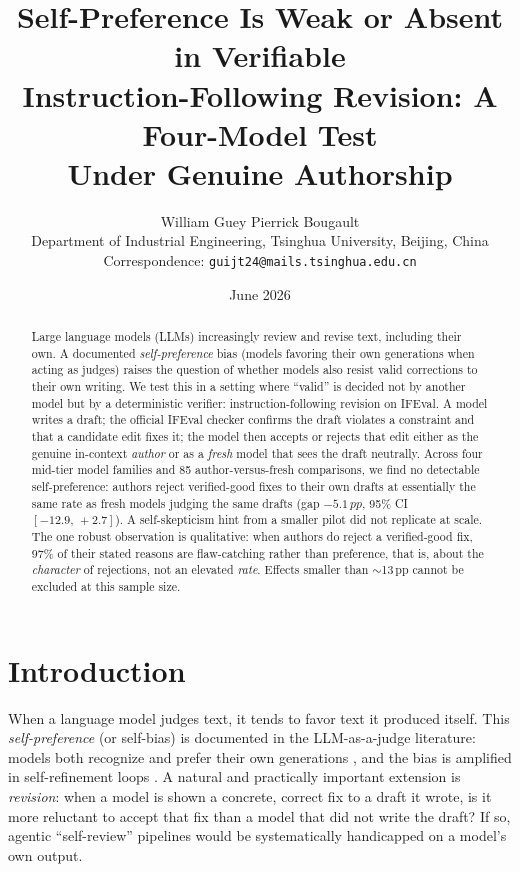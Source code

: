 \documentclass[11pt]{article}
\title{\textbf{Self-Preference Is Weak or Absent in Verifiable\\
Instruction-Following Revision: A Four-Model Test\\
Under Genuine Authorship}}
\author{
William Guey \quad Pierrick Bougault \\[3pt]
\normalsize Department of Industrial Engineering, Tsinghua University, Beijing, China \\[1pt]
\normalsize Correspondence: \texttt{guijt24@mails.tsinghua.edu.cn}
}
\date{June 2026}
\newcommand{\pp}{\,pp}
\newcommand{\CI}[2]{$[#1,\,#2]$}
\begin{document}
\sloppy
\maketitle

\begin{abstract}
\noindent
Large language models (LLMs) increasingly review and revise text, including their own.
A documented \emph{self-preference} bias (models favoring their own generations when
acting as judges) raises the question of whether models also resist valid corrections
to their own writing. We test this in a setting where ``valid'' is decided not by another
model but by a deterministic verifier: instruction-following revision on IFEval. A model
writes a draft; the official IFEval checker confirms the draft violates a constraint and
that a candidate edit fixes it; the model then accepts or rejects that edit either as the
genuine in-context \emph{author} or as a \emph{fresh} model that sees the draft neutrally.
Across four mid-tier model families and 85 author-versus-fresh comparisons, we find no
detectable self-preference: authors reject verified-good fixes to their own drafts at
essentially the same rate as fresh models judging the same drafts (gap $-5.1\pp$, 95\%
CI \CI{-12.9}{+2.7}). A self-skepticism hint from a smaller pilot did not replicate at
scale. The one robust observation is qualitative: when authors do reject a verified-good
fix, $97\%$ of their stated reasons are flaw-catching rather than preference, that is,
about the \emph{character} of rejections, not an elevated \emph{rate}. Effects smaller than
$\sim$13\pp{} cannot be excluded at this sample size.
\end{abstract}

\section{Introduction}

When a language model judges text, it tends to favor text it produced itself. This
\emph{self-preference} (or self-bias) is documented in the LLM-as-a-judge literature: models
both recognize and prefer their own generations \citep{panickssery2024llm}, and the bias
is amplified in self-refinement loops \citep{xu2024pride}. A natural and practically
important extension is \emph{revision}: when a model is shown a concrete, correct fix to a
draft it wrote, is it more reluctant to accept that fix than a model that did not write the
draft? If so, agentic ``self-review'' pipelines would be systematically handicapped on a
model's own output.
\end{document}
